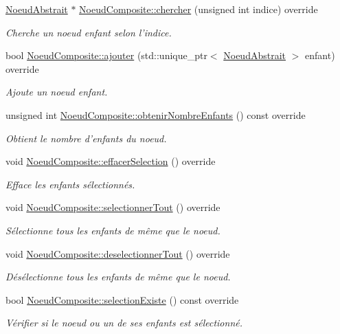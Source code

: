 \begin{DoxyCompactItemize}
\hyperlink{class_noeud_abstrait}{Noeud\-Abstrait} $\ast$ \hyperlink{group__inf2990_ga9f6cf297ac93d75711e1ae85cb0a69ed}{Noeud\-Composite\-::chercher} (unsigned int indice) override
\begin{DoxyCompactList}\small\item\em Cherche un noeud enfant selon l'indice. \end{DoxyCompactList}\item 
bool \hyperlink{group__inf2990_ga5651862ed875690375d9a82a06ecdcb2}{Noeud\-Composite\-::ajouter} (std\-::unique\-\_\-ptr$<$ \hyperlink{class_noeud_abstrait}{Noeud\-Abstrait} $>$ enfant) override
\begin{DoxyCompactList}\small\item\em Ajoute un noeud enfant. \end{DoxyCompactList}\item 
unsigned int \hyperlink{group__inf2990_gae7d523ed724c9cf692bf00dd93226e9c}{Noeud\-Composite\-::obtenir\-Nombre\-Enfants} () const override
\begin{DoxyCompactList}\small\item\em Obtient le nombre d'enfants du noeud. \end{DoxyCompactList}\item 
void \hyperlink{group__inf2990_ga7e3aa1018378eb5e0342b2fe530783cc}{Noeud\-Composite\-::effacer\-Selection} () override
\begin{DoxyCompactList}\small\item\em Efface les enfants sélectionnés. \end{DoxyCompactList}\item 
void \hyperlink{group__inf2990_ga1fb05aa01553f1fa6738711ab172efb6}{Noeud\-Composite\-::selectionner\-Tout} () override
\begin{DoxyCompactList}\small\item\em Sélectionne tous les enfants de même que le noeud. \end{DoxyCompactList}\item 
void \hyperlink{group__inf2990_ga98d6f93f7dc06301f8909e8cf31e3e9e}{Noeud\-Composite\-::deselectionner\-Tout} () override
\begin{DoxyCompactList}\small\item\em Désélectionne tous les enfants de même que le noeud. \end{DoxyCompactList}\item 
bool \hyperlink{group__inf2990_gaa62702a8268ba37e973de9c6900e361d}{Noeud\-Composite\-::selection\-Existe} () const override
\begin{DoxyCompactList}\small\item\em Vérifier si le noeud ou un de ses enfants est sélectionné. \end{DoxyCompactList}\item 

\end{DoxyCompactItemize}
